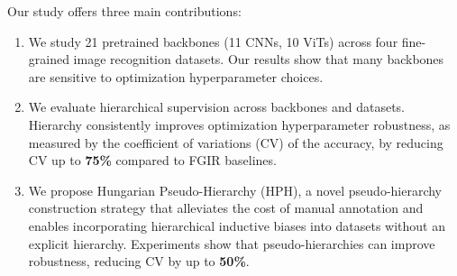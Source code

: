 \documentclass[10pt,twocolumn,letterpaper]{article}
\begin{document}


Our study offers three main contributions: 
\begin{enumerate} [topsep=3pt, itemsep=2pt, parsep=1pt]
    \item We study 21 pretrained backbones (11 CNNs, 10 ViTs) across four fine-grained image recognition datasets. Our results show that many backbones are sensitive to optimization hyperparameter choices. 
    \item We evaluate hierarchical supervision across backbones and datasets. Hierarchy consistently improves optimization hyperparameter robustness, as measured by the coefficient of variations (CV) of the accuracy, by reducing CV up to \textbf{75\%} compared to FGIR baselines.
    \item We propose Hungarian Pseudo-Hierarchy (HPH), a novel pseudo-hierarchy construction strategy that alleviates the cost of manual annotation and enables incorporating hierarchical inductive biases into datasets without an explicit hierarchy. Experiments show that pseudo-hierarchies can improve robustness, reducing CV by up to \textbf{50\%}.
\end{enumerate}
\end{document}
